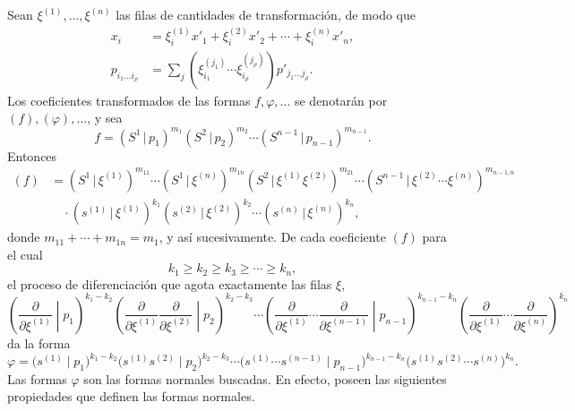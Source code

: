 \documentclass[11pt]{article}
\newcommand{\pair}[2]{(#1\,|\,#2)}
\begin{document}
Sean $\xi^{(1)},\ldots,\xi^{(n)}$ las filas de cantidades de transformación, de modo que
\begin{equation}
\begin{aligned}
x_i&=\xi_i^{(1)}x'_1+\xi_i^{(2)}x'_2+\cdots+\xi_i^{(n)}x'_n,\\
p_{i_1\ldots i_\rho}&=\sum_j(\xi_{i_1}^{(j_1)}\cdots \xi_{i_\rho}^{(j_\rho)})p'_{j_1\ldots j_\rho}.
\end{aligned}
\tag{47}
\end{equation}
Los coeficientes transformados de las formas $f,\varphi,\ldots$ se denotarán por $(f),(\varphi),\ldots$, y sea
\[
 f=\pair{S^1}{p_1}^{m_1}\pair{S^2}{p_2}^{m_2}\cdots\pair{S^{n-1}}{p_{n-1}}^{m_{n-1}}.
\]
Entonces
\begin{equation}
\begin{aligned}
(f)&=\pair{S^1}{\xi^{(1)}}^{m_{11}}\cdots\pair{S^1}{\xi^{(n)}}^{m_{1n}}
\pair{S^2}{\xi^{(1)}\xi^{(2)}}^{m_{21}}\cdots
\pair{S^{n-1}}{\xi^{(2)}\cdots\xi^{(n)}}^{m_{n-1,n}}\\
&\quad\cdot\pair{s^{(1)}}{\xi^{(1)}}^{k_1}\pair{s^{(2)}}{\xi^{(2)}}^{k_2}\cdots\pair{s^{(n)}}{\xi^{(n)}}^{k_n},
\end{aligned}
\tag{48}
\end{equation}
donde $m_{11}+\cdots+m_{1n}=m_1$, y así sucesivamente. De cada coeficiente $(f)$ para el cual
\begin{equation}
 k_1\ge k_2\ge k_3\ge\cdots\ge k_n,
\tag{49}
\end{equation}
el proceso de diferenciación que agota exactamente las filas $\xi$,
\begin{equation}
\left(\frac{\partial}{\partial\xi^{(1)}}\middle|p_1\right)^{k_1-k_2}
\left(\frac{\partial}{\partial\xi^{(1)}}\frac{\partial}{\partial\xi^{(2)}}\middle|p_2\right)^{k_2-k_3}
\cdots
\left(\frac{\partial}{\partial\xi^{(1)}}\cdots\frac{\partial}{\partial\xi^{(n-1)}}\middle|p_{n-1}\right)^{k_{n-1}-k_n}
\left(\frac{\partial}{\partial\xi^{(1)}}\cdots\frac{\partial}{\partial\xi^{(n)}}\right)^{k_n}
\tag{50}
\end{equation}
da la forma
\begin{equation}
 \varphi=\bigl(s^{(1)}\mid p_1\bigr)^{k_1-k_2}
 \bigl(s^{(1)}s^{(2)}\mid p_2\bigr)^{k_2-k_3}\cdots
 \bigl(s^{(1)}\cdots s^{(n-1)}\mid p_{n-1}\bigr)^{k_{n-1}-k_n}
 \bigl(s^{(1)}s^{(2)}\cdots s^{(n)}\bigr)^{k_n}.
\tag{51}
\end{equation}
Las formas $\varphi$ son las formas normales buscadas. En efecto, poseen las siguientes propiedades que definen las formas normales.
\end{document}
